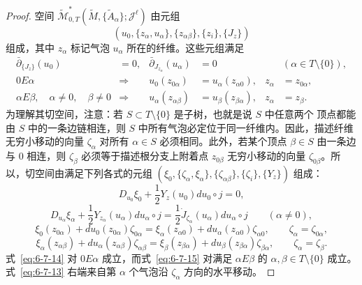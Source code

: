 \begin{proof}
空间
$\widetilde{\mathcal M}^*_{0,T}
(\widetilde M,\{\widetilde A_\alpha\};\mathcal J^\ell)$ 由元组
\[
  (u_0,\{z_\alpha,u_\alpha\},\{z_{\alpha\beta}\},\{z_i\},\{J_z\})
\]
组成，其中 $z_\alpha$ 标记气泡 $u_\alpha$ 所在的纤维。这些元组满足
\begin{align*}
  \bar\partial_{\{J_z\}}(u_0)&=0,
  &\bar\partial_{J_{z_\alpha}}(u_\alpha)&=0
    &&(\alpha\in T\setminus\{0\}),\\
  0E\alpha&\Longrightarrow
  &u_0(z_{0\alpha})&=u_\alpha(z_{\alpha0}),
    &z_\alpha&=z_{0\alpha},\\
  \alpha E\beta,\quad\alpha\ne0,\quad\beta\ne0
  &\Longrightarrow
  &u_\alpha(z_{\alpha\beta})&=u_\beta(z_{\beta\alpha}),
    &z_\alpha&=z_\beta.
\end{align*}
为理解其切空间，注意：若 $S\subset T\setminus\{0\}$ 是子树，也就是说 $S$ 中任意两个
顶点都能由 $S$ 中的一条边链相连，则 $S$ 中所有气泡必定位于同一纤维内。因此，描述纤维
无穷小移动的向量 $\zeta_\alpha$ 对所有 $\alpha\in S$ 必须相同。此外，若某个顶点
$\beta\in S$ 由一条边与 $0$ 相连，则 $\zeta_\beta$ 必须等于描述根分支上附着点
$z_{0\beta}$ 无穷小移动的向量 $\zeta_{0\beta}$。所以，切空间由满足下列各式的元组
$(\xi_0,\{\zeta_\alpha,\xi_\alpha\},\{\zeta_{\alpha\beta}\},
\{\zeta_i\},\{Y_z\})$ 组成：
\begin{equation}\label{eq:6-7-12}
  D_{u_0}\xi_0+\frac12Y_z(u_0)du_0\circ j=0,
\end{equation}
\begin{equation}\label{eq:6-7-13}
  D_{u_\alpha}\xi_\alpha
  +\frac12Y_{z_\alpha}(u_\alpha)du_\alpha\circ j
  =\frac12\dot J_{\zeta_\alpha}(u_\alpha)du_\alpha\circ j
  \qquad(\alpha\ne0),
\end{equation}
\begin{equation}\label{eq:6-7-14}
  \xi_0(z_{0\alpha})+du_0(z_{0\alpha})\zeta_{0\alpha}
  =\xi_\alpha(z_{\alpha0})+du_\alpha(z_{\alpha0})\zeta_{\alpha0},
  \qquad \zeta_\alpha=\zeta_{0\alpha},
\end{equation}
\begin{equation}\label{eq:6-7-15}
  \xi_\alpha(z_{\alpha\beta})+du_\alpha(z_{\alpha\beta})\zeta_{\alpha\beta}
  =\xi_\beta(z_{\beta\alpha})+du_\beta(z_{\beta\alpha})\zeta_{\beta\alpha},
  \qquad \zeta_\alpha=\zeta_\beta.
\end{equation}
式~\eqref{eq:6-7-14} 对 $0E\alpha$ 成立，而式~\eqref{eq:6-7-15} 对满足
$\alpha E\beta$ 的 $\alpha,\beta\in T\setminus\{0\}$ 成立。式~\eqref{eq:6-7-13}
右端来自第 $\alpha$ 个气泡沿 $\zeta_\alpha$ 方向的水平移动。


\end{proof}
